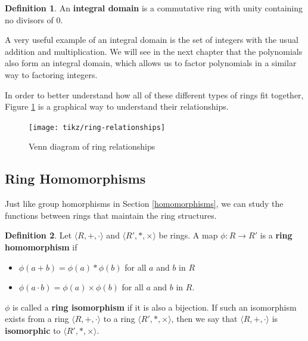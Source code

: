 \documentclass[
]{book}
\providecommand{\tightlist}{%
  \setlength{\itemsep}{0pt}\setlength{\parskip}{0pt}}
\theoremstyle{definition}
\newtheorem{definition}{Definition}[chapter]
\theoremstyle{definition}
\theoremstyle{definition}
\theoremstyle{definition}
\theoremstyle{remark}
\begin{document}
\begin{definition}
An \textbf{integral domain} is a commutative ring with unity containing no divisors of \(0\).
\end{definition}

A very useful example of an integral domain is the set of integers with the usual addition and multiplication. We will see in the next chapter that the polynomials also form an integral domain, which allows us to factor polynomials in a similar way to factoring integers.

In order to better understand how all of these different types of rings fit together, Figure \ref{fig:venn-rings} is a graphical way to understand their relationships.

\begin{figure}

{\centering \texttt{[image: tikz/ring-relationships]} 

}

\caption{Venn diagram of ring relationships}\label{fig:venn-rings}
\end{figure}

\hypertarget{ring-homomorphisms}{%
\subsection{Ring Homomorphisms}\label{ring-homomorphisms}}

Just like group homorphisms in Section \ref{homomorphisms}, we can study the functions between rings that maintain the ring structures.

\begin{definition}
Let \(\langle R,+,\cdot\rangle\) and \(\langle R',\ast,\times\rangle\) be rings. A map \(\phi:R\rightarrow R'\) is a \textbf{ring homomorphism} if

\begin{itemize}
\tightlist
\item
  \(\phi(a+b)=\phi(a) \ast \phi(b)\) for all \(a\) and \(b\) in \(R\)
\item
  \(\phi(a\cdot b)=\phi(a)\times \phi(b)\) for all \(a\) and \(b\) in \(R\).
\end{itemize}

\(\phi\) is called a \textbf{ring isomorphism} if it is also a bijection. If such an isomorphism exists from a ring \(\langle R,+,\cdot\rangle\) to a ring \(\langle R',\ast,\times\rangle\), then we say that \(\langle R,+,\cdot\rangle\) is \textbf{isomorphic} to \(\langle R',\ast,\times\rangle\).
\end{definition}
\end{document}
